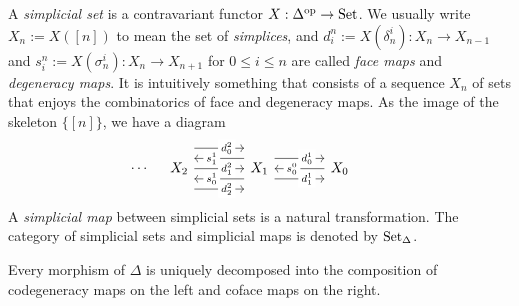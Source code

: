 \documentclass{../../../small}
\begin{document}
\begin{prb}
A \emph{simplicial set} is a contravariant functor $X:\Delta^{\mathrm{op}}\to\operatorname{Set}$.
We usually write $X_n:=X([n])$ to mean the set of \emph{simplices}, and $d_i^n:=X(\delta_n^i):X_n\to X_{n-1}$ and $s_i^n:=X(\sigma_n^i):X_n\to X_{n+1}$ for $0\le i\le n$ are called \emph{face maps} and \emph{degeneracy maps}.
It is intuitively something that consists of a sequence $X_n$ of sets that enjoys the combinatorics of face and degeneracy maps.
As the image of the skeleton $\{[n]\}$, we have a diagram
\[\begin{tikzcd}[sep=large]
\,\rar[phantom,"\cdots"]
&X_2
\rar["d^2_0"description,pos=0.65,shift left=6]
\rar["d^2_1"description,pos=0.65]
\rar["d^2_2"description,pos=0.65,shift right=6]
&X_1
\lar["s^1_0"description,pos=0.65,shift left=3]
\lar["s^1_1"description,pos=0.65,shift right=3]
\rar["d^1_0"description,pos=0.65,shift left=3]
\rar["d^1_1"description,pos=0.65,shift right=3]
&X_0
\lar["s^0_0"description,pos=0.65]&\,
\end{tikzcd}\]
A \emph{simplicial map} between simplicial sets is a natural transformation.
The category of simplicial sets and simplicial maps is denoted by $\operatorname{Set}_\Delta$.

\begin{parts}
\item Every morphism of $\Delta$ is uniquely decomposed into the composition of codegeneracy maps on the left and coface maps on the right.
\end{parts}
\end{prb}
\end{document}
